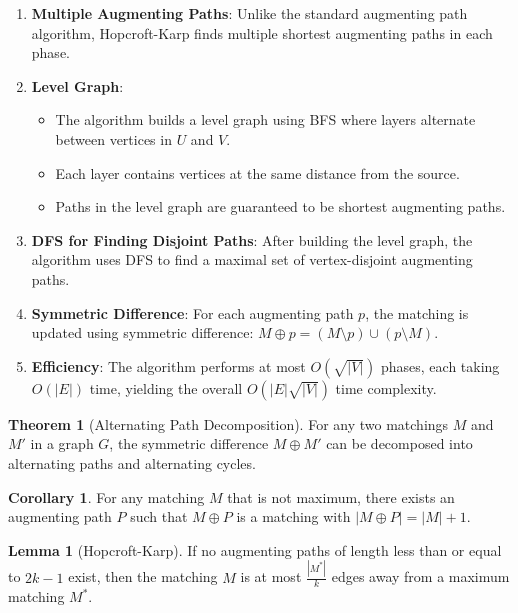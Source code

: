 \documentclass{article}
\theoremstyle{definition}
\newtheorem{theorem}{Theorem}
\newtheorem{lemma}{Lemma}
\newtheorem{corollary}{Corollary}
\begin{document}
\begin{enumerate}
\item \textbf{Multiple Augmenting Paths}: Unlike the standard augmenting path algorithm, Hopcroft-Karp finds multiple shortest augmenting paths in each phase.

\item \textbf{Level Graph}: 
   \begin{itemize}
   \item The algorithm builds a level graph using BFS where layers alternate between vertices in $U$ and $V$.
   \item Each layer contains vertices at the same distance from the source.
   \item Paths in the level graph are guaranteed to be shortest augmenting paths.
   \end{itemize}

\item \textbf{DFS for Finding Disjoint Paths}: After building the level graph, the algorithm uses DFS to find a maximal set of vertex-disjoint augmenting paths.

\item \textbf{Symmetric Difference}: For each augmenting path $p$, the matching is updated using symmetric difference: $M \oplus p = (M \setminus p) \cup (p \setminus M)$.

\item \textbf{Efficiency}: The algorithm performs at most $O(\sqrt{|V|})$ phases, each taking $O(|E|)$ time, yielding the overall $O(|E|\sqrt{|V|})$ time complexity.
\end{enumerate}

\begin{theorem}[Alternating Path Decomposition]
For any two matchings $M$ and $M'$ in a graph $G$, the symmetric difference $M \oplus M'$ can be decomposed into alternating paths and alternating cycles.
\end{theorem}

\begin{corollary}
For any matching $M$ that is not maximum, there exists an augmenting path $P$ such that $M \oplus P$ is a matching with $|M \oplus P| = |M| + 1$.
\end{corollary}

\begin{lemma}[Hopcroft-Karp]
If no augmenting paths of length less than or equal to $2k-1$ exist, then the matching $M$ is at most $\frac{|M^*|}{k}$ edges away from a maximum matching $M^*$.
\end{lemma}
\end{document}

